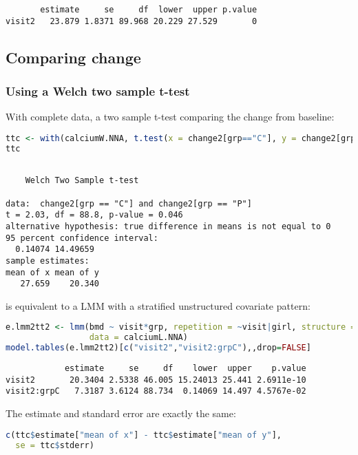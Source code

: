 \documentclass[12pt]{article}
\begin{document}
\label{}
\begin{verbatim}
       estimate     se     df  lower  upper p.value
visit2   23.879 1.8371 89.968 20.229 27.529       0
\end{verbatim}


\clearpage
\subsection{Comparing change}
\label{sec:org50d75c3}
\subsubsection{Using a Welch two sample t-test}
\label{sec:orgac3d371}

With complete data, a two sample t-test comparing the change from baseline:
\begin{lstlisting}[language=r,numbers=none]
ttc <- with(calciumW.NNA, t.test(x = change2[grp=="C"], y = change2[grp=="P"]))
ttc
\end{lstlisting}

\label{}
\begin{verbatim}

	Welch Two Sample t-test

data:  change2[grp == "C"] and change2[grp == "P"]
t = 2.03, df = 88.8, p-value = 0.046
alternative hypothesis: true difference in means is not equal to 0
95 percent confidence interval:
  0.14074 14.49659
sample estimates:
mean of x mean of y 
   27.659    20.340
\end{verbatim}

is equivalent to a LMM with a stratified unstructured covariate pattern:
\begin{lstlisting}[language=r,numbers=none]
e.lmm2tt2 <- lmm(bmd ~ visit*grp, repetition = ~visit|girl, structure = UN(~grp),
                 data = calciumL.NNA)
model.tables(e.lmm2tt2)[c("visit2","visit2:grpC"),,drop=FALSE]
\end{lstlisting}

\label{}
\begin{verbatim}
            estimate     se     df    lower  upper    p.value
visit2       20.3404 2.5338 46.005 15.24013 25.441 2.6911e-10
visit2:grpC   7.3187 3.6124 88.734  0.14069 14.497 4.5767e-02
\end{verbatim}


The estimate and standard error are exactly the same:
\begin{lstlisting}[language=r,numbers=none]
c(ttc$estimate["mean of x"] - ttc$estimate["mean of y"],
  se = ttc$stderr)
\end{lstlisting}
\end{document}
